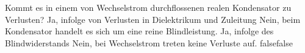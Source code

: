     {Kommt es in einem von Wechselstrom durchflossenen realen Kondensator zu Verlusten?}
    {Ja, infolge von Verlusten in Dielektrikum und Zuleitung}
    {Nein, beim Kondensator handelt es sich  um eine reine Blindleistung.}
    {Ja, infolge des Blindwiderstands}
    {Nein, bei Wechselstrom treten keine Verluste auf.}
    {false}{false}